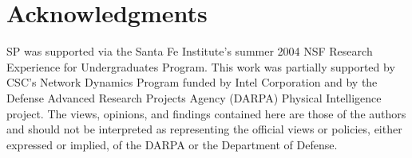 \documentclass[pre,twocolumn,showpacs,superscriptaddress,preprintnumbers,floatfix]{revtex4}
\theoremstyle{plain}    \newtheorem{Lem}{Lemma}
\theoremstyle{plain}    \newtheorem*{ProLem}{Proof}
\theoremstyle{plain}    \newtheorem{Cor}{Corollary}
\theoremstyle{plain}    \newtheorem*{ProCor}{Proof}
\theoremstyle{plain}    \newtheorem{The}{Theorem}
\theoremstyle{plain}    \newtheorem*{ProThe}{Proof}
\theoremstyle{plain}    \newtheorem{Prop}{Proposition}
\theoremstyle{plain}    \newtheorem*{ProProp}{Proof}
\theoremstyle{plain}    \newtheorem*{Conj}{Conjecture}
\theoremstyle{plain}    \newtheorem*{Rem}{Remark}
\theoremstyle{plain}    \newtheorem{Def}{Definition}
\theoremstyle{plain}    \newtheorem*{Not}{Notation}
\begin{document}
\section*{Acknowledgments}

SP was supported via the Santa Fe Institute's summer 2004 NSF Research
Experience for Undergraduates Program. This work was partially supported by
CSC's Network Dynamics Program funded by Intel Corporation and by the Defense
Advanced Research Projects Agency (DARPA) Physical Intelligence project. The
views, opinions, and findings contained here are those of the authors and
should not be interpreted as representing the official views or policies,
either expressed or implied, of the DARPA or the Department of Defense.

%


\end{document}

